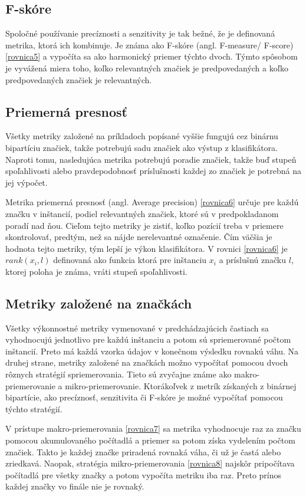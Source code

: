 \subsection*{F-skóre}
Spoločné používanie precíznosti a senzitivity je tak bežné, že je definovaná metrika, ktorá ich kombinuje. Je známa ako F-skóre (angl. F-measure/ F-score) \eqref{rovnica5} a vypočíta sa ako harmonický priemer týchto dvoch. Týmto spôsobom je vyvážená miera toho, koľko relevantných značiek je predpovedaných a koľko predpovedaných značiek je relevantných.

\subsection*{Priemerná presnosť}
Všetky metriky založené na príkladoch popísané vyššie fungujú cez binárnu bipartíciu značiek, takže potrebujú sadu značiek ako výstup z klasifikátora. Naproti tomu, nasledujúca metrika potrebujú poradie značiek, takže buď stupeň spoľahlivosti alebo pravdepodobnosť príslušnosti každej zo značiek je potrebná na jej výpočet.

Metrika priemerná presnosť (angl. Average precision) \eqref{rovnica6} určuje pre každú značku v inštancií, podiel relevantných značiek, ktoré sú v predpokladanom poradí nad ňou. Cieľom tejto metriky je zistiť, koľko pozícií treba v priemere skontrolovať, predtým, než sa nájde nerelevantné označenie. Čím väčšia je hodnota tejto metriky, tým lepší je výkon klasifikátora.
V rovnici \eqref{rovnica6} je \(rank(x_{i},l)\) definovaná ako funkcia ktorá pre inštanciu \(x_{i}\) a príslušnú značku \(l \), ktorej poloha je známa, vráti stupeň spoľahlivosti.


\subsection*{Metriky založené na značkách}
Všetky výkonnostné metriky vymenované v predchádzajúcich častiach sa vyhodnocujú jednotlivo pre každú inštanciu a potom sú spriemerované počtom inštancií. Preto má každá vzorka údajov v konečnom výsledku rovnakú váhu. Na druhej strane, metriky založené na značkách možno vypočítať pomocou dvoch rôznych stratégií spriemerovania. Tieto sú zvyčajne známe ako makro-priemerovanie a mikro-priemerovanie. Ktorákoľvek z metrík získaných z binárnej bipartície, ako precíznosť, senzitivita či F-skóre je možné vypočítať pomocou týchto stratégií.

V prístupe makro-priemerovania \eqref{rovnica7} sa metrika vyhodnocuje raz za značku pomocou akumulovaného počítadlá a priemer sa potom získa vydelením počtom značiek. Takto je každej značke priradená rovnaká váha, či už je častá alebo zriedkavá. Naopak, stratégia mikro-priemerovania \eqref{rovnica8} najskôr pripočítava počítadlá pre všetky značky a potom vypočíta metriku iba raz. Preto prínos každej značky vo finále nie je rovnaký.


